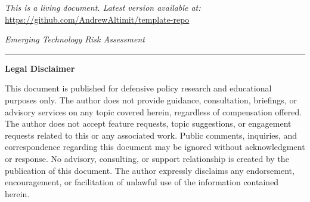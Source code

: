 \documentclass[11pt,letterpaper]{article}
\makeatletter
\newcommand{\etraneed}[1]{\par\if@nobreak\else\penalty\z@\ifdim\pagegoal<\maxdimen\ifdim\dimexpr\pagegoal-\pagetotal\relax<\dimexpr#1\relax\newpage\fi\fi\fi}
\makeatother
\begin{document}
\vspace{0.5cm}

\etraneed{7\baselineskip}
\begin{center}
\small
\textit{This is a living document. Latest version available at:}\\[0.3em]
\url{https://github.com/AndrewAltimit/template-repo}
\end{center}

\vspace{0.5cm}

\begin{center}
\textit{Emerging Technology Risk Assessment}
\end{center}

\vspace{1cm}

\noindent\rule{\textwidth}{0.4pt}

\vspace{0.3cm}

\begin{center}
\small\textbf{Legal Disclaimer}
\end{center}

\vspace{0.2cm}

\noindent\small This document is published for defensive policy research and educational purposes only. The author does not provide guidance, consultation, briefings, or advisory services on any topic covered herein, regardless of compensation offered. The author does not accept feature requests, topic suggestions, or engagement requests related to this or any associated work. Public comments, inquiries, and correspondence regarding this document may be ignored without acknowledgment or response. No advisory, consulting, or support relationship is created by the publication of this document. The author expressly disclaims any endorsement, encouragement, or facilitation of unlawful use of the information contained herein.
\end{document}
